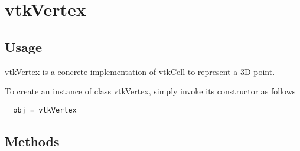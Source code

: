 \section{vtkVertex}

\subsection{Usage}

 vtkVertex is a concrete implementation of vtkCell to represent a 3D point.

To create an instance of class vtkVertex, simply
invoke its constructor as follows
\begin{verbatim}
  obj = vtkVertex
\end{verbatim}
\subsection{Methods}

